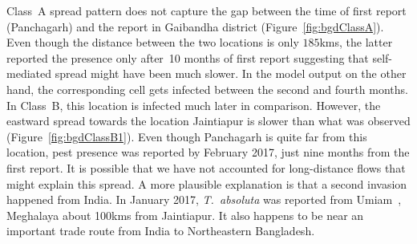 \documentclass[11pt]{article}
\newcommand{\tuta}{\emph{T.~absoluta}}
\newcommand{\aacomment}[1]{({\color{magenta}AA: #1})}
\newcommand{\afm}{\alpha_{\ell}}
\newcommand{\ald}{\alpha_{\ell d}}
\newcommand{\mooreRange}{r_\mathrm{M}}
\theoremstyle{definition}
\begin{document}

Class~A spread pattern does not capture the gap between the time of first
report (Panchagarh) and the report in Gaibandha district
(Figure~\ref{fig:bgdClassA}). Even though the distance between the two
locations is only $185$kms, the latter reported the presence only after~10
months of first report suggesting that self-mediated spread might have been
much slower. In the model output on the other hand, the corresponding cell
gets infected between the second and fourth months.  In Class~B, this
location is infected much later in comparison. However, the eastward spread
towards the location Jaintiapur is slower than what was observed
(Figure~\ref{fig:bgdClassB1}). Even though Panchagarh is quite far from
this location, pest presence was reported by February 2017, just nine
months from the first report. It is possible that we have not accounted for
long-distance flows that might explain this spread. A more plausible
explanation is that a second invasion happened from India. In January 2017,
\tuta{} was reported from Umiam~\cite{sankarganesh2017}, Meghalaya about
100kms from Jaintiapur.  It also happens to be near an important trade
route from India to Northeastern Bangladesh.
\end{document}
